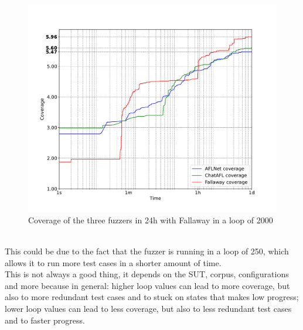 \begin{figure}[H]
    \centering
    \includegraphics[width=1\textwidth]{Images/coverage_over_time_lighttpd-1day-2000l.pdf}
    \caption{Coverage of the three fuzzers in 24h with Fallaway in a loop of 2000}
    \label{fig:coverage_10hours}
\end{figure}
\phantom{}\\
This could be due to the fact that the fuzzer is running in a loop of 250, which allows it to run more test cases in a shorter amount of time.
\\This is not always a good thing, it depends on the SUT, corpus, configurations and more because in general: higher loop values can lead to more coverage, but also to more redundant test cases and to stuck on states that makes low progress; lower loop values can lead to less coverage, but also to less redundant test cases and to faster progress.
